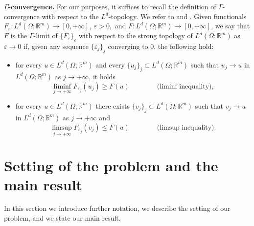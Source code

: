 \documentclass{article}
\theoremstyle{plain}
\theoremstyle{definition}
\def\e{\varepsilon}
\def\rr{{\mathbb R}}
\newcommand{\ej}{\varepsilon_j}
\numberwithin{equation}{section}
\begin{document}
\smallskip

{\bf $\Gamma$-convergence.} For our purposes, it suffices to recall the definition of $\Gamma$-convergence with respect to the $L^d$-topology. We refer to \cite{BDF} and \cite{DM}. Given functionals $F_\e:L^d(\Omega;\rr^m)\to[0,+\infty], \ \e>0,$ and $F:L^d(\Omega;\rr^m)\to[0,+\infty]$, we say that $F$ is the $\Gamma$-limit of $\{F_\e\}_\e$ with respect to the strong topology of $L^d(\Omega;\rr^m)$ as $\e\to0$ if, given any sequence $\{\ej\}_j$ converging to $0$, the following hold:
\begin{itemize}
    \item[$(i)$] for every $u\in L^d(\Omega;\rr^m)$ and every $\{u_j\}_j\subset L^d(\Omega;\rr^m)$ such that $u_j\to u$ in $L^d(\Omega;\rr^m)$ as $j\to+\infty$, it holds
    \begin{equation*}
        \liminf_{j\to+\infty} F_{\ej}(u_j)\geq F(u) \qquad \qquad \text{(liminf inequality)},
    \end{equation*}
    \item[$(ii)$] for every $u\in L^d(\Omega;\rr^m)$ there exists $\{v_j\}_j\subset L^d(\Omega;\rr^m)$ such that $v_j\to u$ in $L^d(\Omega;\rr^m)$ as $j\to+\infty$ and
    \begin{equation*}
        \limsup_{j\to+\infty} F_{\ej}(v_j)\leq F(u) \qquad \qquad \text{(limsup inequality)}.
    \end{equation*}
\end{itemize}

\section{Setting of the problem and the main result}
\label{Sec: Setting of the problem and the main result}
In this section we introduce further notation, we describe the setting of our problem, and we state our main result.
\end{document}
